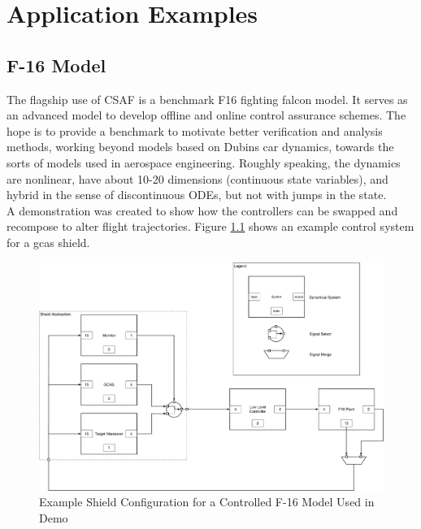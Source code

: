 \chapter{Application Examples}
\section{F-16 Model}

The flagship use of CSAF is a benchmark F16 fighting falcon model. It serves as an advanced model to develop 
offline and online control assurance schemes. The hope is to provide a benchmark to motivate better 
verification and analysis methods, working beyond models based on Dubins car dynamics, towards the sorts of 
models used in aerospace engineering. Roughly speaking, the dynamics are nonlinear, have about 10-20 
dimensions (continuous state variables), and hybrid in the sense of discontinuous ODEs, but not with jumps in 
the state. \\

A demonstration was created to show how the controllers can be swapped and recompose to alter flight 
trajectories. Figure \ref{fig:f16demoblock} shows an example control system for a \acrlong{gcas} shield.

\begin{figure}[h]
\centering
\includegraphics[width=\linewidth]{./img/f16demoblock.pdf}
\caption{Example Shield Configuration for a Controlled F-16 Model Used in Demo}
\label{fig:f16demoblock}
\end{figure}



